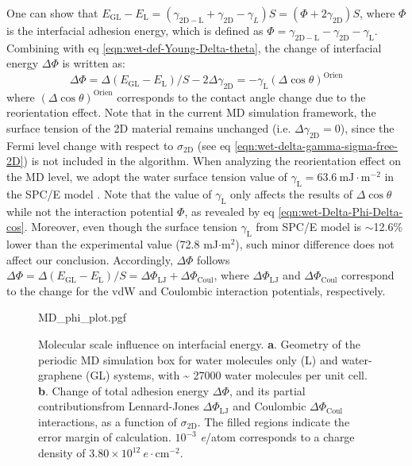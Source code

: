 %
One can show that
\(E_{\mathrm{GL}} - E_{\mathrm{L}} = (\gamma_{\mathrm{2D-L}} +
\gamma_{\mathrm{2D}} - \gamma_{L})S = (\Phi + 2
\gamma_{\mathrm{2D}})S\), where \(\Phi\) is the interfacial adhesion energy,
which is defined as
\(\Phi = \gamma_{\mathrm{2D-L}} - \gamma_{\mathrm{2D}} -
\gamma_{\mathrm{L}}\).
Combining with eq
\autoref{eqn:wet-def-Young-Delta-theta}, the change of interfacial
energy \(\Delta \Phi\) is written as:
\begin{equation}
\label{eqn:wet-Delta-Phi-Delta-cos}
\Delta \Phi = \Delta (E_{\mathrm{GL}} - E_{\mathrm{L}})/S - 2\Delta \gamma_{\mathrm{2D}} = -\gamma_{\mathrm{L}} (\Delta \cos \theta)^{\mathrm{Orien}}
\end{equation}
where \((\Delta\cos \theta)^{\mathrm{Orien}}\) corresponds to the
contact angle change due to the reorientation effect.
%
Note that in the
current MD simulation framework, the surface tension of the 2D material
remains unchanged (i.e.  \(\Delta \gamma_{\mathrm{2D}}=0\)), since the
Fermi level change with respect to \(\sigma_{\mathrm{2D}}\) (see eq
\autoref{eqn:wet-delta-gamma-sigma-free-2D}) is not included in the algorithm.
%
When analyzing the reorientation effect on the MD level, we adopt the
water surface tension value of
\(\gamma_{\mathrm{L}}=63.6\ \mathrm{mJ}\cdot \mathrm{m}^{-2}\) in the
SPC/E model \cite{Vega_2007_tension}.
%
Note that the value of
\(\gamma_{\mathrm{L}}\) only affects the results of
\(\Delta \cos \theta\) while not the interaction potential \(\Phi\), as revealed by eq
\autoref{eqn:wet-Delta-Phi-Delta-cos}.
%
Moreover, even though the surface tension $\gamma_{\mathrm{L}}$ from
SPC/E model is $\sim{}$12.6\% lower than the experimental value (72.8
mJ\(\cdot\)m\(^2\)), such minor difference does not affect our
conclusion.
%
Accordingly, \(\Delta \Phi\) follows
\(\Delta \Phi = \Delta (E_{\mathrm{GL}} - E_{\mathrm{L}})/S = \Delta
\Phi_{\mathrm{LJ}} + \Delta \Phi_{\mathrm{Coul}}\), where
\(\Delta \Phi_{\mathrm{LJ}}\) and \(\Delta \Phi_{\mathrm{Coul}}\)
correspond to the change for the vdW and Coulombic interaction
potentials, respectively.

\begin{figure}[!htbp]
  \centering
  {MD_phi_plot.pgf}
  \caption{\label{fig:wet-MD-res1}%
    Molecular scale influence on interfacial
    energy. \textbf{a}. Geometry of the periodic MD simulation box for
    water molecules only (L) and water-graphene (GL) systems, with
    \textasciitilde{} 27000 water molecules per unit cell.
    \textbf{b}. Change
    of total adhesion energy \(\Delta\Phi\), and its partial
    contributionsfrom Lennard-Jones \(\Delta\Phi_{\mathrm{LJ}}\) and
    Coulombic \(\Delta\Phi_{\mathrm{Coul}}\) interactions, as a
    function of \(\sigma_{\mathrm{2D}}\). The filled regions indicate
    the error margin of calculation. \(10^{-3}\) \textit{e}/atom
    corresponds to a charge density of
    \(3.80 \times 10^{12}\ e \cdot \mathrm{cm}^{-2}\).}
\end{figure}


